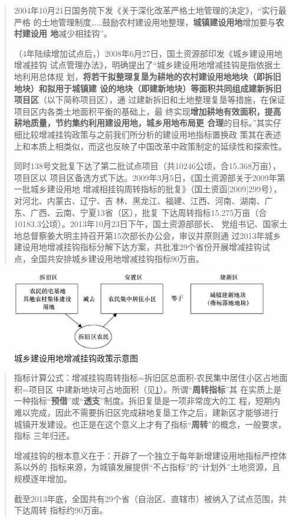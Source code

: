 \begin{quotation}
  2004年10月21日国务院下发《关于深化改革严格土地管理的决定》，“实行最严格
  的土地管理制度……鼓励农村建设用地整理，\textbf{城镇建设用地}增加要与\textbf{农村建设用
    地}减少相挂钩”。

  （4年陆续增加试点后，）2008年6月27日，国土资源部印发《城乡建设用地增减挂钩
  试点管理办法》，明确提出了“城乡建设用地增减挂钩是指依据土地利用总体规
  划，\textbf{将若干拟整理复垦为耕地的农村建设用地地块（即拆旧地块）和拟用于城镇建
    设的地块（即建新地块）等面积共同组成建新拆旧项目区}（以下简称项目区），通
  过建新拆旧和土地整理复垦等措施，在保证项目区内各类土地面积平衡的基础上，最
  终实现\textbf{增加耕地有效面积，提高耕地质量，节约集约利用建设用地，城乡用地布局更
  合理}的目标。”其实仔细比较增减挂钩政策与之前我们所分析的建设用地指标置换政
  策其在表述上和本质上相类似，而这也反映了中国改革中政策制定的延续性和探索性。

  同时138号文批复下达了第二批试点项目（共10246公顷，合15.368万亩），项目区以
  项目区备选方式下达。2009年3月5日，《国土资源部关于2009年第一批城乡建设用地
  增减相挂钩周转指标的批复》（国土资函[2009]299号），对河北、内蒙古、辽宁、吉
  林、黑龙江、福建、江西、河南、湖南、广东、广西、云南、宁夏13省（区），批复
  下达周转指标15.275万亩（合10183.3公顷）。2013年10月23日下午，国土资源部部长、
  党组书记、国家土地总督察姜大明主持召开第15次部长办公会，审议并原则通
  过2013年城乡建设用地增减挂钩指标分解下达方案，共批准29个省份开展增减挂钩试
  点，全国共安排城乡建设用地增减挂钩指标90万亩。\cite{yangdi}
\end{quotation}

\begin{figure}[htbp!]
  \centering
  \includegraphics[width=0.9\linewidth]{figures/zengjianguagou.jpg}
  \caption{\label{fig:zengjianguagou}城乡建设用地增减挂钩政策示意图}
\end{figure}

\begin{quotation}
  指标计算公式：增减挂钩周转指标=拆旧区总面积-农民集中居住小区占地面积=项目区
  中建新地块可占地面积（见\cref{fig:zengjianguagou}）。所谓“\textbf{周转指标}”其
  在实质上是一种指标“\textbf{预借}”或“\textbf{透支}”制度。拆旧复垦是一项非常庞大的工
  程，短期内难以完成，因此不需要拆旧区完成耕地复垦工作之后，建新区才能够进行
  城镇开发建设。也正是在这个意义上才有了指标“\textbf{周转}”的概念，一般要求，指标
  三年归还。

  增减挂钩的根本意义在于：开辟了一个独立于每年新增建设用地指标严控体系以外的
  指标来源，为城镇发展提供“不占指标”的“计划外”土地资源，且规模逐年增加。\cite{yangdi}

  截至2013年底，全国共有29个省（自治区、直辖市）被纳入了试点范围，共下达周转
  指标约90万亩。\cite{zengjianzongshu}
\end{quotation}


